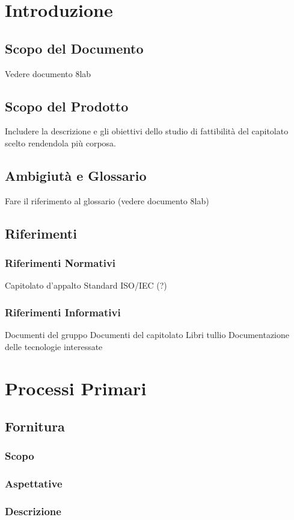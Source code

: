 \section{Introduzione}
\subsection{Scopo del Documento}
Vedere documento 8lab
\subsection{Scopo del Prodotto}
Includere la descrizione e gli obiettivi dello studio di fattibilità del capitolato scelto rendendola più corposa.
\subsection{Ambigiutà e Glossario}
Fare il riferimento al glossario (vedere documento 8lab)
\subsection{Riferimenti}
\subsubsection{Riferimenti Normativi}
Capitolato d'appalto
Standard ISO/IEC (?)
\subsubsection{Riferimenti Informativi}
Documenti del gruppo
Documenti del capitolato
Libri tullio
Documentazione delle tecnologie interessate
\section{Processi Primari}

\subsection{Fornitura}
\subsubsection{Scopo}
\subsubsection{Aspettative}
\subsubsection{Descrizione}
